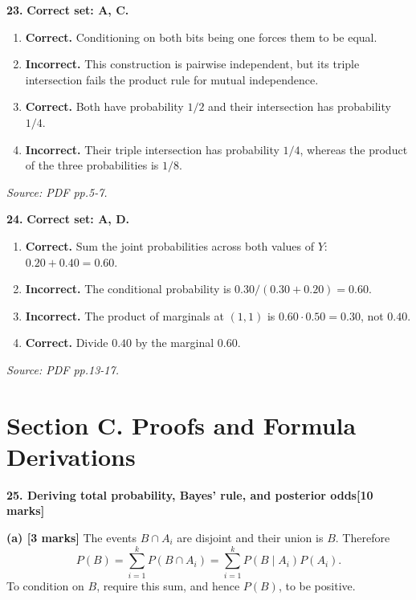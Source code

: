 \documentclass[11pt,a4paper]{article}
\begin{document}
\par\noindent\begin{minipage}{\linewidth}
\textbf{23.} \textbf{Correct set: A, C.}
\begin{enumerate}[label=(\Alph*),leftmargin=8mm,itemsep=2pt,topsep=2pt]
\item \textbf{Correct.} Conditioning on both bits being one forces them to be equal.
\item \textbf{Incorrect.} This construction is pairwise independent, but its triple intersection fails the product rule for mutual independence.
\item \textbf{Correct.} Both have probability \(1/2\) and their intersection has probability \(1/4\).
\item \textbf{Incorrect.} Their triple intersection has probability \(1/4\), whereas the product of the three probabilities is \(1/8\).
\end{enumerate}
{\footnotesize\textit{Source: PDF pp.5-7.}}

\end{minipage}\par\vspace{3mm}
\par\noindent\begin{minipage}{\linewidth}
\textbf{24.} \textbf{Correct set: A, D.}
\begin{enumerate}[label=(\Alph*),leftmargin=8mm,itemsep=2pt,topsep=2pt]
\item \textbf{Correct.} Sum the joint probabilities across both values of \(Y\): \(0.20+0.40=0.60\).
\item \textbf{Incorrect.} The conditional probability is \(0.30/(0.30+0.20)=0.60\).
\item \textbf{Incorrect.} The product of marginals at \((1,1)\) is \(0.60\cdot0.50=0.30\), not \(0.40\).
\item \textbf{Correct.} Divide \(0.40\) by the marginal \(0.60\).
\end{enumerate}
{\footnotesize\textit{Source: PDF pp.13-17.}}

\end{minipage}\par\vspace{3mm}
\newpage\section*{Section C. Proofs and Formula Derivations}
\textbf{25. Deriving total probability, Bayes' rule, and posterior odds}\hfill\textbf{[10 marks]}\par\medskip
\textbf{(a) [3 marks]} The events \(B\cap A_i\) are disjoint and their union is \(B\). Therefore \[P(B)=\sum_{i=1}^kP(B\cap A_i)=\sum_{i=1}^kP(B\mid A_i)P(A_i).\] To condition on \(B\), require this sum, and hence \(P(B)\), to be positive.
\end{document}

